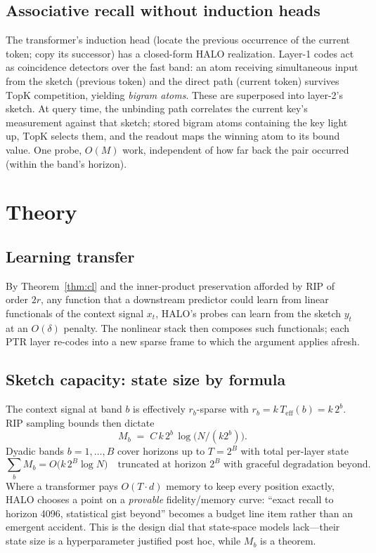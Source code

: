 \documentclass[11pt]{article}
\newcommand{\topk}{\mathrm{TopK}}
\begin{document}
\subsection{Associative recall without induction heads}
\label{sec:bigram}

The transformer's induction head (locate the previous occurrence of the current token; copy its successor) has a closed-form HALO realization. Layer-1 codes act as coincidence detectors over the fast band: an atom receiving simultaneous input from the sketch (previous token) and the direct path (current token) survives $\topk$ competition, yielding \emph{bigram atoms}. These are superposed into layer-2's sketch. At query time, the unbinding path correlates the current key's measurement against that sketch; stored bigram atoms containing the key light up, $\topk$ selects them, and the readout maps the winning atom to its bound value. One probe, $O(M)$ work, independent of how far back the pair occurred (within the band's horizon).

\section{Theory}
\label{sec:theory}

\subsection{Learning transfer}

By Theorem~\ref{thm:cl} and the inner-product preservation afforded by RIP of order $2r$, any function that a downstream predictor could learn from linear functionals of the context signal $x_t$, HALO's probes can learn from the sketch $y_t$ at an $O(\delta)$ penalty. The nonlinear stack then composes such functionals; each PTR layer re-codes into a new sparse frame to which the argument applies afresh.

\subsection{Sketch capacity: state size by formula}
\label{sec:capacity}

The context signal at band $b$ is effectively $r_b$-sparse with $r_b = k\,T_{\mathrm{eff}}(b) = k\,2^b$. RIP sampling bounds \citep{baraniuk2008simple} then dictate
\begin{equation}
\label{eq:capacity}
M_b \;=\; C\, k\, 2^{b} \,\log\!\big(N / (k 2^b)\big).
\end{equation}
Dyadic bands $b = 1,\dots,B$ cover horizons up to $T = 2^B$ with total per-layer state
\begin{equation}
\sum_b M_b = O\!\big(k\,2^B \log N\big) \quad\text{truncated at horizon } 2^B \text{ with graceful degradation beyond.}
\end{equation}
Where a transformer pays $O(T \cdot d)$ memory to keep every position exactly, HALO chooses a point on a \emph{provable} fidelity/memory curve: ``exact recall to horizon 4096, statistical gist beyond'' becomes a budget line item rather than an emergent accident. This is the design dial that state-space models lack---their state size is a hyperparameter justified post hoc, while $M_b$ is a theorem.
\end{document}
